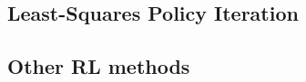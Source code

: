 \subsection{Least-Squares Policy Iteration \cite{LSPI}}
    \todo
\subsection{Other RL methods}  %
    \todo